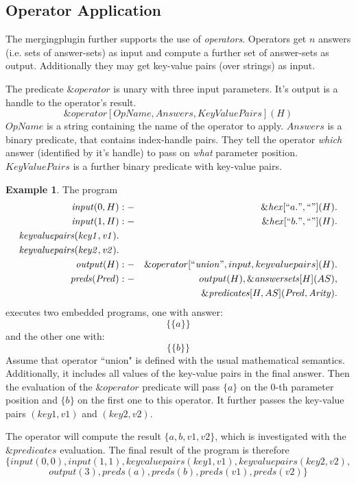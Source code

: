 \documentclass[a4paper,11pt]{article}
\theoremstyle{definition}
\newtheorem{example}{Example}
\newenvironment{mathprogram}[1][P]
	{
		\renewcommand{\ruleimplication}{&:-&}
		\newcommand{\ruledelimiter}{1}
		\begin{eqnarray*}
	}
	{
		\end{eqnarray*}
	}
\newcommand{\ruleimplication}{\ensuremath{\mathit{:-}}}
\begin{document}
			
		\subsection{Operator Application}
		\label{sec:ExternalAtoms:Operators}
		
			The mergingplugin further supports the use of \emph{operators}. Operators get $n$ answers (i.e. sets of answer-sets) as input and compute a further set of answer-sets as
			output. Additionally they may get key-value pairs (over strings) as input.
			
			The predicate $\mathit{\&operator}$ is unary with three input parameters. It's output is a handle to the operator's result.
				$$\mathit{\&operator}[\mathit{OpName}, \mathit{Answers}, \mathit{KeyValuePairs}](H)$$
			$\mathit{OpName}$ is a string containing the name of the operator to apply. $\mathit{Answers}$ is a binary predicate, that contains index-handle pairs. They tell the operator
			\emph{which} answer (identified by it's handle) to pass on \emph{what} parameter position. $\mathit{KeyValuePairs}$ is a further binary predicate with key-value pairs.
			
			\begin{example}
				\label{ex:arguments}
				The program
				\begin{mathprogram}
\mathit{input}(0, H) 		\ruleimplication	\mathit{\&hex}[``a.", ``"](H). \\
\mathit{input}(1, H) 		\ruleimplication	\mathit{\&hex}[``b.", ``"](H). \\
\mathit{keyvaluepairs}(\mathit{key1}, \mathit{v1}). \\
\mathit{keyvaluepairs}(\mathit{key2}, \mathit{v2}). \\
\mathit{output}(H) 			\ruleimplication	\&operator[``\mathit{union}", input, keyvaluepairs](H). \\
\mathit{preds}(\mathit{Pred}) \ruleimplication output(H), \mathit{\&answersets}[H](AS), \\
								&&				\mathit{\&predicates}[H, AS](\mathit{Pred}, \mathit{Arity}).
				\end{mathprogram}
				executes two embedded programs, one with answer:
					$$\{ \{a\} \}$$
				and the other one with:
					$$\{ \{b\} \}$$
				Assume that operator ``union" is defined with the usual mathematical semantics. Additionally, it includes all values of the key-value pairs in the final answer.
				Then the evaluation of the $\mathit{\&operator}$ predicate will pass $\{a\}$ on the $0$-th
				parameter position and $\{b\}$ on the first one to this operator. It further passes the key-value pairs $(\mathit{key1}, \mathit{v1})$ and $(\mathit{key2}, \mathit{v2})$.
				
				The operator will compute the result $\{ a, b, \mathit{v1}, \mathit{v2} \}$, which is investigated with the $\&predicates$ evaluation. The final result of the program is
				therefore
					$$\{ \mathit{input}(0,0), \mathit{input}(1,1), \mathit{keyvaluepairs}(\mathit{key1},\mathit{v1}), \mathit{keyvaluepairs}(\mathit{key2},\mathit{v2}),$$
					$$\mathit{output}(3), \mathit{preds}(a), \mathit{preds}(b), \mathit{preds}(\mathit{v1}), \mathit{preds}(\mathit{v2}) \}$$
			\end{example}
\end{document}
